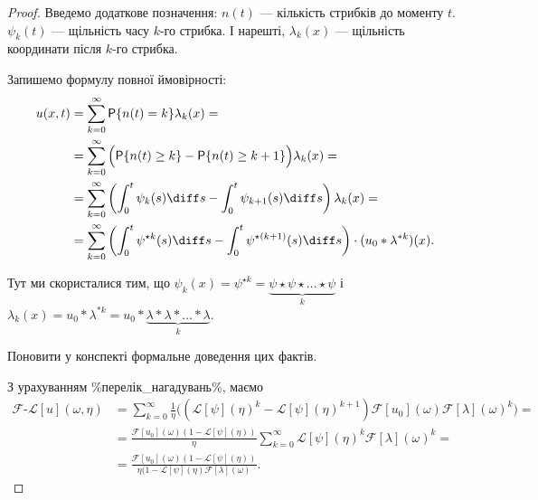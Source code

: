 \begin{proof}
    Введемо додаткове позначення: $n(t)$ --- кількість стрибків до моменту $t$. $\psi_k(t)$ --- щільність часу $k$-го стрибка. І нарешті, $\lambda_k(x)$ --- щільність координати після $k$-го стрибка. \medskip

    Запишемо формулу повної ймовірності:
    \begin{equation}
        \begin{aligned}
            u(x, t)
            &= \sum_{k = 0}^\infty \mathsf{P}\{n(t) = k\} \lambda_k (x) = \\
            &= \sum_{k = 0}^\infty \Big(\mathsf{P}\{n(t) \ge k\} - \mathsf{P}\{n(t) \ge k + 1\}\Big) \lambda_k (x) = \\
            &= \sum_{k = 0}^\infty \left( \int_0^t \psi_k(s) \diff s - \int_0^t \psi_{k + 1} (s) \diff s \right) \lambda_k (x) = \\
            &= \sum_{k = 0}^\infty \left( \int_0^t \psi^{\star k}(s) \diff s - \int_0^t \psi^{\star(k + 1)} (s) \diff s \right) \cdot (u_0 * \lambda^{*k}) (x).
        \end{aligned}
    \end{equation}

    \begin{remark}
        Тут ми скористалися тим, що $\psi_k(x) = \psi^{\star k} = \underset{k}{\underbrace{\psi \star \psi \star \ldots \star \psi}}$ і $\lambda_k(x) = u_0 * \lambda^{* k} = u_0 * \underset{k}{\underbrace{\lambda * \lambda * \ldots * \lambda}}$.
    \end{remark}
    
    \begin{exercise}
        Поновити у конспекті формальне доведення цих фактів.
    \end{exercise}

    З урахуванням \%перелік\_нагадувань\%, маємо
    \begin{equation}
        \begin{aligned}
            \mathcal{F}\text{-}\mathscr{L}[u](\omega, \eta) 
            &= \sum_{k = 0}^\infty \frac{1}{\eta} \Big( (\mathscr{L}[\psi](\eta)^k - \mathscr{L}[\psi](\eta)^{k + 1}) \mathcal{F}[u_0](\omega) \mathcal{F}[\lambda](\omega)^k \Big) = \\
            &= \frac{\mathcal{F}[u_0](\omega) (1 - \mathscr{L}[\psi](\eta))}{\eta} \sum_{k = 0}^\infty \mathscr{L}[\psi](\eta)^{k} \mathcal{F}[\lambda](\omega)^k = \\
            &= \frac{\mathcal{F}[u_0](\omega) (1 - \mathscr{L}[\psi](\eta))}{\eta (1 - \mathscr{L}[\psi](\eta) \mathcal{F}[\lambda](\omega)}.
        \end{aligned}
    \end{equation}
\end{proof}
